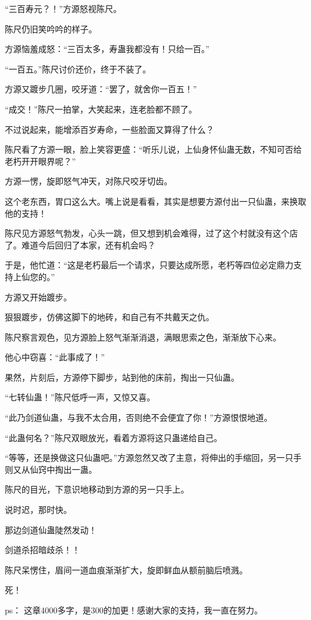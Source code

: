\begin{this_body}
“三百寿元？！”方源怒视陈尺。

陈尺仍旧笑吟吟的样子。

方源恼羞成怒：“三百太多，寿蛊我都没有！只给一百。”

“一百五。”陈尺讨价还价，终于不装了。

方源又踱步几圈，咬牙道：“罢了，就舍你一百五！”

“成交！”陈尺一拍掌，大笑起来，连老脸都不顾了。

不过说起来，能增添百岁寿命，一些脸面又算得了什么？

陈尺看了方源一眼，脸上笑容更盛：“听乐儿说，上仙身怀仙蛊无数，不知可否给老朽开开眼界呢？”

方源一愣，旋即怒气冲天，对陈尺咬牙切齿。

这个老东西，胃口这么大。嘴上说是看看，其实是想要方源付出一只仙蛊，来换取他的支持！

陈尺见方源怒气勃发，心头一跳，但又想到机会难得，过了这个村就没有这个店了。难道今后回归了本家，还有机会吗？

于是，他忙道：“这是老朽最后一个请求，只要达成所愿，老朽等四位必定鼎力支持上仙您的。”

方源又开始踱步。

狠狠踱步，仿佛这脚下的地砖，和自己有不共戴天之仇。

陈尺察言观色，见方源脸上怒气渐渐消退，满眼思索之色，渐渐放下心来。

他心中窃喜：“此事成了！”

果然，片刻后，方源停下脚步，站到他的床前，掏出一只仙蛊。

“七转仙蛊！”陈尺低呼一声，又惊又喜。

“此乃剑道仙蛊，与我不太合用，否则绝不会便宜了你！”方源恨恨地道。

“此蛊何名？”陈尺双眼放光，看着方源将这只蛊递给自己。

“等等，还是换做这只仙蛊吧。”方源忽然又改了主意，将伸出的手缩回，另一只手则又从仙窍中掏出一蛊。

陈尺的目光，下意识地移动到方源的另一只手上。

说时迟，那时快。

那边剑道仙蛊陡然发动！

剑道杀招暗歧杀！！

陈尺呆愣住，眉间一道血痕渐渐扩大，旋即鲜血从额前脑后喷溅。

死！

ps：    这章4000多字，是300的加更！感谢大家的支持，我一直在努力。

\end{this_body}

